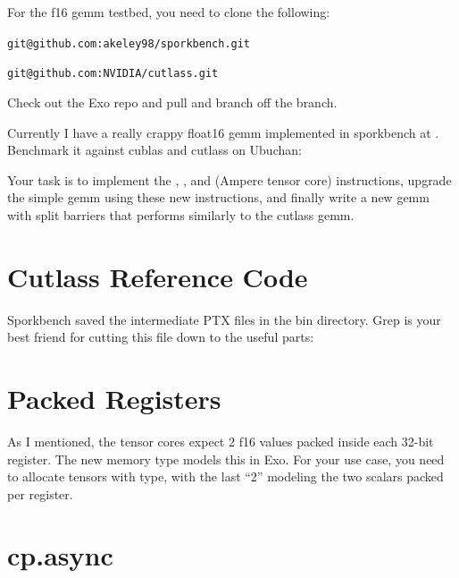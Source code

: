 


\raggedright

For the f16 gemm testbed, you need to clone the following:

\texttt{git@github.com:akeley98/sporkbench.git} 

\texttt{git@github.com:NVIDIA/cutlass.git}

Check out the Exo repo and pull and branch off the  branch.

Currently I have a really crappy float16 gemm implemented in sporkbench at .\\
Benchmark it against cublas and cutlass on Ubuchan:



Your task is to implement the , , and  (Ampere tensor core) instructions, upgrade the simple gemm using these new instructions, and finally write a new gemm with split barriers that performs similarly to the cutlass gemm.

\section{Cutlass Reference Code}

Sporkbench saved the intermediate PTX files in the bin directory.
Grep is your best friend for cutting this file down to the useful parts:



\section{Packed Registers}

As I mentioned, the tensor cores expect 2 f16 values packed inside each 32-bit register.
The new  memory type models this in Exo.
For your use case, you need to allocate tensors with  type, with the last ``2'' modeling the two scalars packed per register.

\section{cp.async}

